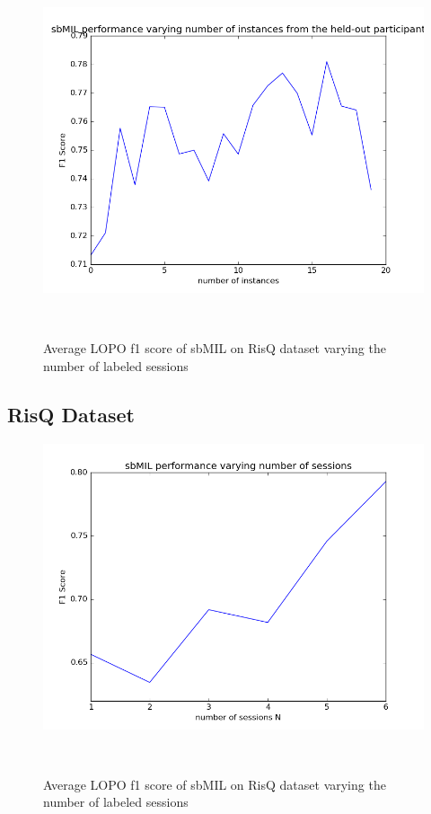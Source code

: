 \documentclass{sigchi}
\begin{document}
\begin{figure}
\centering
  \includegraphics[width=0.9\columnwidth]{figures/test_instances}
  \caption{Average LOPO f1 score of sbMIL on RisQ dataset varying the number of labeled sessions}~\label{fig:figure4}
\end{figure}

\subsection{RisQ Dataset}

\begin{figure}
\centering
  \includegraphics[width=0.9\columnwidth]{figures/sessions}
  \caption{Average LOPO f1 score of sbMIL on RisQ dataset varying the number of labeled sessions}~\label{fig:figure5}
\end{figure}
\end{document}
